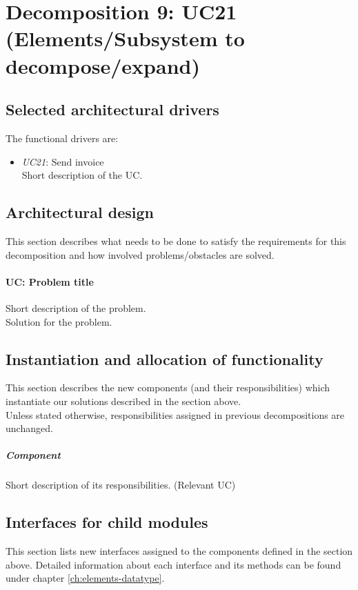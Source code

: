 \section{Decomposition 9: UC21 (Elements/Subsystem to decompose/expand)}


\subsection{Selected architectural drivers}
    The functional drivers are:
    \begin{itemize}
        \item \emph{UC21}: Send invoice \\
              Short description of the UC.
    \end{itemize}


\subsection{Architectural design}
    This section describes what needs to be done to satisfy the requirements for
    this decomposition and how involved problems/obstacles are solved.

    \paragraph{UC: Problem title}
        Short description of the problem.\\
        Solution for the problem.


\subsection{Instantiation and allocation of functionality}
    This section describes the new components (and their responsibilities)
    which instantiate our solutions described in the section above. \\
    Unless stated otherwise, responsibilities assigned in previous decompositions are unchanged.

    \subparagraph{Component}
        Short description of its responsibilities. (Relevant UC)


\subsection{Interfaces for child modules}
    This section lists new interfaces assigned to the components defined
    in the section above. Detailed information about each interface and
    its methods can be found under chapter \ref{ch:elements-datatype}. \\

